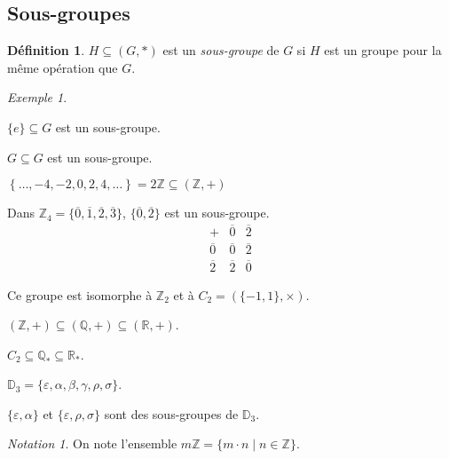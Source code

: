 \documentclass{report}
\newcommand*{\reels}{\mathbb{R}}
\newcommand*{\entiers}{\mathbb{Z}}
\newcommand*{\rationels}{\mathbb{Q}}
\theoremstyle{definition}
\newtheorem*{defin}{D\'efinition}
\theoremstyle{remark}
\newtheorem*{exem}{Exemple}
\newtheorem*{nota}{Notation}
\begin{document}
	\subsection{Sous-groupes}
	\begin{defin}
		$H \subseteq (G,*)$ est un \emph{sous-groupe} de $G$ si $H$ est un groupe pour la m\^eme op\'eration que $G$.
	\end{defin}
	\begin{exem}
		~

		\begin{ulist}
			\item $\{e\} \subseteq G$ est un sous-groupe.
			\item $G \subseteq G$ est un sous-groupe.
			\item $\left\lbrace \dotsc, -4, -2, 0, 2, 4, \dotsc \right\rbrace = 2\entiers \subseteq (\entiers,+)$
			\item Dans $\entiers_4 = \{\overline0, \overline1, \overline2, \overline3\}$, $\{\overline0, \overline2\}$ est un sous-groupe.
			\renewcommand{\arraystretch}{1.5}
			\[
			\begin{array}{c||c|c}
				+&\overline0&\overline2\\
				\hline\hline
				\overline0&\overline0&\overline2\\
				\hline
				\overline2&\overline2&\overline0
			\end{array}
			\]
			\renewcommand{\arraystretch}{1}

			Ce groupe est isomorphe \`a $\entiers_2$ et \`a $C_2=\left( \{-1,1\}, \times \right)$.
			\item $(\entiers,+) \subseteq (\rationels,+) \subseteq (\reels,+)$.
			\item $C_2 \subseteq \rationels_* \subseteq \reels_*$.
			\item $\mathbb{D}_3 = \{\varepsilon, \alpha, \beta, \gamma, \rho, \sigma\}$.

			$\{\varepsilon, \alpha\}$ et $\{\varepsilon, \rho, \sigma\}$ sont des sous-groupes de $\mathbb{D}_3$.
		\end{ulist}
		\begin{nota}
			On note l'ensemble $m\entiers = \{m \cdot n \mid n \in \entiers\}$.
		\end{nota}
	\end{exem}
\end{document}
